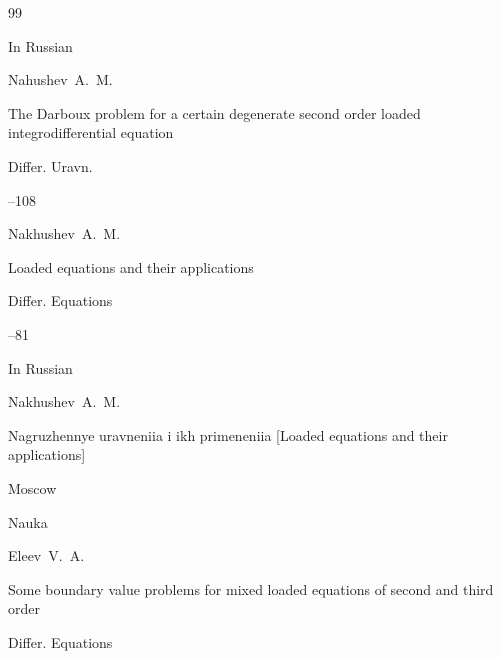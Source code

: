 \begin{thebibliography}{99}








\lang In Russian

\by Nahushev~A.~M.

\paper The Darboux problem for a certain degenerate second order loaded integrodifferential equation

\jour Differ. Uravn.




–108









\by Nakhushev~A.~M.

\paper Loaded equations and their applications

\jour Differ. Equations 



--81 





\lang In Russian

\by Nakhushev~A.~M.

\book Nagruzhennye uravneniia i ikh primeneniia  \rm [Loaded equations and their applications]

\publaddr Moscow

\publ Nauka 







\by Eleev~V.~A.

\paper Some boundary value problems for mixed loaded equations of second and third order

\jour Differ. Equations 



\end{thebibliography}
